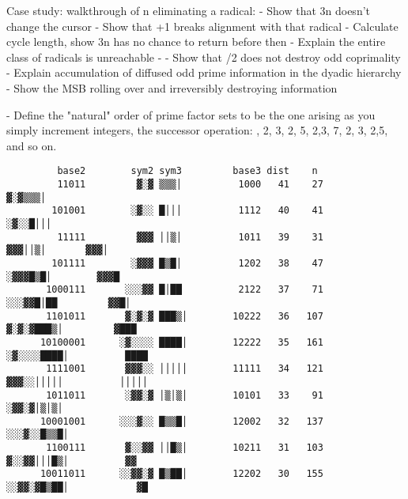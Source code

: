\documentclass[12pt]{article}
\theoremstyle{plain}
\theoremstyle{definition}
\begin{document}
Case study: walkthrough of n eliminating a radical:
- Show that 3n doesn't change the cursor
- Show that +1 breaks alignment with that radical
- Calculate cycle length, show 3n has no chance to return before then
- Explain the entire class of radicals is unreachable
- 
- Show that /2 does not destroy odd coprimality
- Explain accumulation of diffused odd prime information in the dyadic hierarchy
- Show the MSB rolling over and irreversibly destroying information

- Define the "natural" order of prime factor sets to be the one arising as you simply increment integers, the successor operation: {}, {2}, {3}, {2}, {5}, {2,3}, {7}, {2}, {3}, {2,5}, and so on.

\begin{lstlisting}
         base2        sym2 sym3         base3 dist    n                                               
         11011         ▓░▓ ▒▒▒│          1000   41    27                                           ▓░▓▒▒▒│                                
        101001        ░▓░░ █│││          1112   40    41                                         ░▓░░█│││                                   
         11111         ▓▓▓ ││▒│          1011   39    31                                         ▓▓▓││▒│       ▓▓▓│                               
        101111        ░▓▓▓ █▒█│          1202   38    47                                       ░▓▓▓█▒█│        ▓▓▓█                               
       1000111       ░░░▓▓ █│██          2122   37    71                                     ░░░▓▓█│██         ▓▓█│                               
       1101011       ▓░▓░▓ ███▒│        10222   36   107                                    ▓░▓░▓███▒│         ▓███                                   
      10100001      ░▓░░░░ ████│        12222   35   161                                  ░▓░░░░████│          ████                                   
       1111001       ▓▓▓░░ │││││        11111   34   121                                  ▓▓▓░░│││││          │││││                                   
       1011011       ░▓▓░▓ │▒│▒│        10101   33    91                                 ░▓▓░▓│▒│▒│                                                       
      10001001      ░░░▓░░ █▒▒█│        12002   32   137                               ░░░▓░░█▒▒█│                                                        
       1100111       ▓░░▓▓ ││█▒│        10211   31   103                               ▓░░▓▓│││█▒│          ▓▓                            
      10011011      ░░▓▓░▓ █▒██│        12202   30   155                             ░░▓▓░▓█▒██│            ▓█                            

\end{lstlisting}
\end{document}
